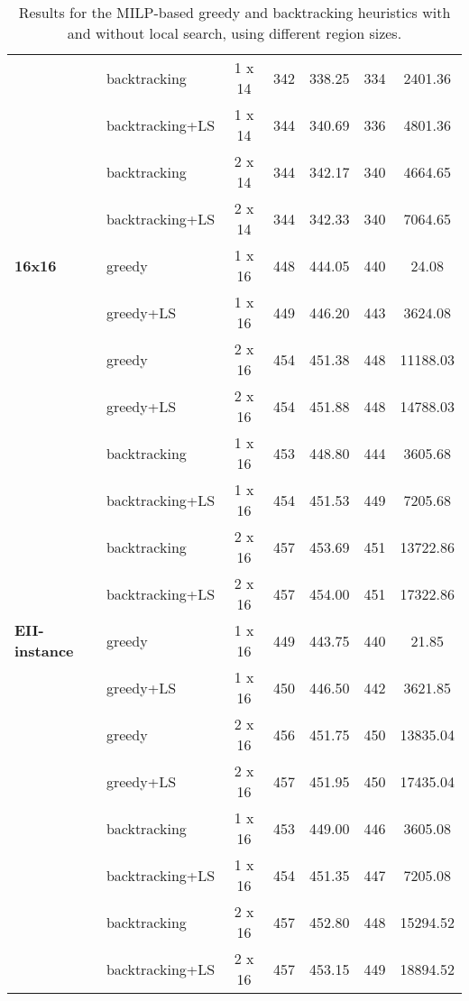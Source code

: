 \documentclass[preprint,12pt]{elsarticle}
\begin{document}
\begin{table}[h]
\begin{tabular}{| l l | c c c c c |}
	 & 	backtracking	 & 	1 x 14	 & 	342	 & 	338.25	 & 	334	 & 	2401.36	\\
	 & 	backtracking+LS	 & 	1 x 14	 & 	344	 & 	340.69	 & 	336	 & 	4801.36	\\
	 & 	backtracking	 & 	2 x 14	 & 	344	 & 	342.17	 & 	340	 & 	4664.65	\\
	 & 	backtracking+LS	 & 	2 x 14	 & 	344	 & 	342.33	 & 	340	 & 	7064.65	\\\hline
\textbf{16x16	} & 	greedy	 & 	1 x 16	 & 	448	 & 	444.05	 & 	440	 & 	24.08	\\
	 & 	greedy+LS	 & 	1 x 16	 & 	449	 & 	446.20	 & 	443	 & 	3624.08	\\
	 & 	greedy	 & 	2 x 16	 & 	454	 & 	451.38	 & 	448	 & 	11188.03	\\
	 & 	greedy+LS	 & 	2 x 16	 & 	454	 & 	451.88	 & 	448	 & 	14788.03	\\
	 & 	backtracking	 & 	1 x 16	 & 	453	 & 	448.80	 & 	444	 & 	3605.68	\\
	 & 	backtracking+LS	 & 	1 x 16	 & 	454	 & 	451.53	 & 	449	 & 	7205.68	\\
	 & 	backtracking	 & 	2 x 16	 & 	457	 & 	453.69	 & 	451	 & 	13722.86	\\
	 & 	backtracking+LS	 & 	2 x 16	 & 	457	 & 	454.00	 & 	451	 & 	17322.86	\\\hline
\textbf{EII-instance}	 & 	greedy	 & 	1 x 16	 & 	449	 & 	443.75	 & 	440	 & 	21.85	\\
	 & 	greedy+LS	 & 	1 x 16	 & 	450	 & 	446.50	 & 	442	 & 	3621.85	\\
	 & 	greedy	 & 	2 x 16	 & 	456	 & 	451.75	 & 	450	 & 	13835.04	\\
	 & 	greedy+LS	 & 	2 x 16	 & 	457	 & 	451.95	 & 	450	 & 	17435.04	\\
	 & 	backtracking	 & 	1 x 16	 & 	453	 & 	449.00	 & 	446	 & 	3605.08	\\
	 & 	backtracking+LS	 & 	1 x 16	 & 	454	 & 	451.35	 & 	447	 & 	7205.08	\\
	 & 	backtracking	 & 	2 x 16	 & 	457	 & 	452.80	 & 	448	 & 	15294.52	\\
	 & 	backtracking+LS	 & 	2 x 16	 & 	457	 & 	453.15	 & 	449	 & 	18894.52	\\\hline
\end{tabular}
	\caption{Results for the MILP-based greedy and backtracking heuristics with and without local search, using different region sizes.}
	\label{tab:greedyconstruct}
	

\end{table}
\end{document}
